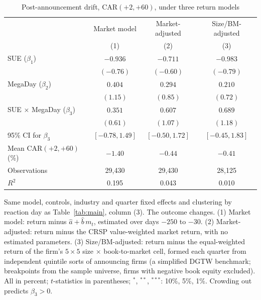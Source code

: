 \begin{table}[htbp]
\centering
\small
\caption{Post-announcement drift, CAR$(+2,+60)$, under three return models}
\label{tab:drift_robust}
\begin{tabular}{lccc}
\toprule
 & Market model & Market-adjusted & Size/BM-adjusted \\
 & (1) & (2) & (3) \\
\midrule
SUE ($\beta_1$) & $-0.936$ & $-0.711$ & $-0.983$ \\
 & $(-0.76)$ & $(-0.60)$ & $(-0.79)$ \\[2pt]
MegaDay ($\beta_2$) & $0.404$ & $0.294$ & $0.210$ \\
 & $(1.15)$ & $(0.85)$ & $(0.72)$ \\[2pt]
SUE $\times$ MegaDay ($\beta_3$) & $0.351$ & $0.607$ & $0.689$ \\
 & $(0.61)$ & $(1.07)$ & $(1.18)$ \\[2pt]
\midrule
95\% CI for $\beta_3$ & $[-0.78, 1.49]$ & $[-0.50, 1.72]$ & $[-0.45, 1.83]$ \\
Mean CAR$(+2,+60)$ (\%) & $-1.40$ & $-0.44$ & $-0.41$ \\
Observations & 29,430 & 29,430 & 28,125 \\
$R^2$ & 0.195 & 0.043 & 0.010 \\
\bottomrule
\end{tabular}
\par\medskip
\parbox{0.95\linewidth}{\footnotesize Same model, controls, industry and quarter fixed effects and clustering by reaction day as Table~\ref{tab:main}, column (3). The outcome changes. (1) Market model: return minus $\hat a + \hat b\,m_t$, estimated over days $-250$ to $-30$. (2) Market-adjusted: return minus the CRSP value-weighted market return, with no estimated parameters. (3) Size/BM-adjusted: return minus the equal-weighted return of the firm's $5\times5$ size $\times$ book-to-market cell, formed each quarter from independent quintile sorts of announcing firms (a simplified DGTW benchmark; breakpoints from the sample universe, firms with negative book equity excluded). All in percent; $t$-statistics in parentheses; $^{*}$, $^{**}$, $^{***}$: 10\%, 5\%, 1\%. Crowding out predicts $\beta_3>0$.}
\end{table}
